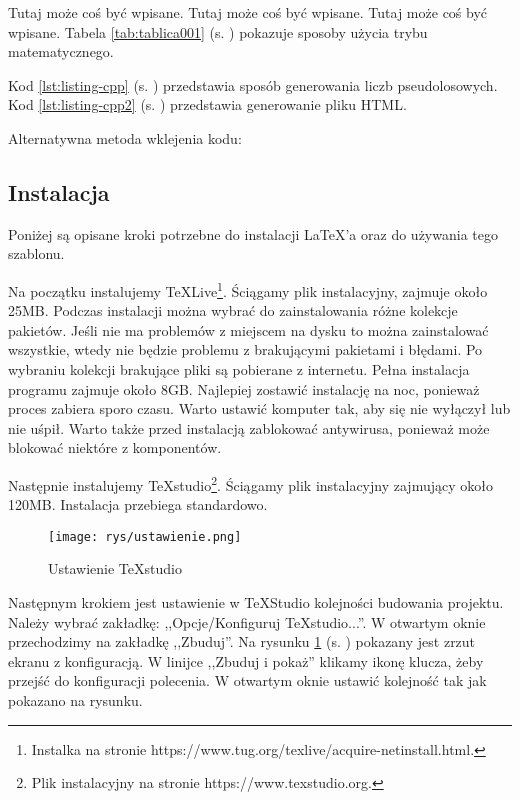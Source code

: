 Tutaj może coś być wpisane. Tutaj może coś być wpisane. Tutaj może coś być wpisane. Tabela \ref{tab:tablica001} (s. \pageref{tab:tablica001}) pokazuje sposoby użycia trybu matematycznego.

Kod \ref{lst:listing-cpp} (s. \pageref{lst:listing-cpp}) przedstawia sposób generowania liczb pseudolosowych. Kod \ref{lst:listing-cpp2} (s. \pageref{lst:listing-cpp2}) przedstawia generowanie pliku HTML.

Alternatywna metoda wklejenia kodu:




\subsection{Instalacja}  %

\hspace{0.60cm}Poniżej są opisane kroki potrzebne do instalacji \LaTeX 'a oraz do używania tego szablonu.

 Na początku instalujemy \TeX{}Live\footnote{Instalka na stronie  https://www.tug.org/texlive/acquire-netinstall.html\cite{www2}.}. Ściągamy plik instalacyjny, zajmuje około 25MB. Podczas instalacji można wybrać do zainstalowania różne kolekcje pakietów. Jeśli nie ma problemów z miejscem na dysku to można zainstalować wszystkie, wtedy nie będzie problemu z brakującymi pakietami i błędami. Po wybraniu kolekcji brakujące pliki są pobierane z internetu. Pełna instalacja programu zajmuje około 8GB. Najlepiej zostawić instalację na noc, ponieważ proces zabiera sporo czasu. Warto ustawić komputer tak, aby się nie wyłączył lub nie uśpił. Warto także przed instalacją zablokować antywirusa, ponieważ może blokować niektóre z komponentów.
 
Następnie instalujemy \TeX{}studio\footnote{Plik instalacyjny na stronie  https://www.texstudio.org\cite{www3}.}. Ściągamy plik instalacyjny zajmujący około 120MB. Instalacja przebiega standardowo.

\begin{figure}[!hbt]
	\begin{center}
		\texttt{[image: rys/ustawienie.png]}
		\caption{Ustawienie TeXstudio}
		\label{rys:ustawienia}
	\end{center}
\end{figure}

Następnym krokiem jest ustawienie w \TeX{}Studio kolejności budowania projektu. Należy wybrać zakładkę: ,,Opcje/Konfiguruj \TeX{}studio...''. W otwartym oknie przechodzimy na zakładkę ,,Zbuduj''. Na rysunku \ref{rys:ustawienia} (s. \pageref{rys:ustawienia}) pokazany jest zrzut ekranu z konfiguracją. W linijce ,,Zbuduj i pokaż'' klikamy ikonę klucza, żeby przejść do konfiguracji polecenia. W otwartym oknie ustawić kolejność tak jak pokazano na rysunku.

 
 
 
 
 